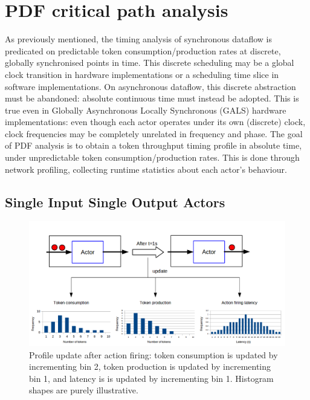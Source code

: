 \section{PDF critical path analysis}\label{sec:pdf}


As previously mentioned, the timing analysis of synchronous dataflow is predicated on predictable token consumption/production rates at discrete, globally synchronised points in time. This discrete scheduling may be a global clock transition in hardware implementations or a scheduling time slice in software implementations. On asynchronous dataflow, this discrete abstraction must be abandoned: absolute continuous time must instead be adopted. This is true even in Globally Asynchronous Locally Synchronous (GALS) hardware implementations: even though each actor operates under its own (discrete) clock, clock frequencies may be completely unrelated in frequency and phase. The goal of PDF analysis is to obtain a token throughput timing profile in absolute time, under unpredictable token consumption/production rates. This is done through network profiling, collecting runtime statistics about each actor's behaviour.

\subsection{Single Input Single Output Actors}

\begin{figure}[tb]
  \centering
  \includegraphics[width=1\columnwidth]{img/example1.png}
  \caption{Profile update after action firing: token consumption is updated by incrementing bin 2, token production is updated by incrementing bin 1, and latency is is updated by incrementing bin 1. Histogram shapes are purely illustrative.}
  \label{fig:example1}
\end{figure}




